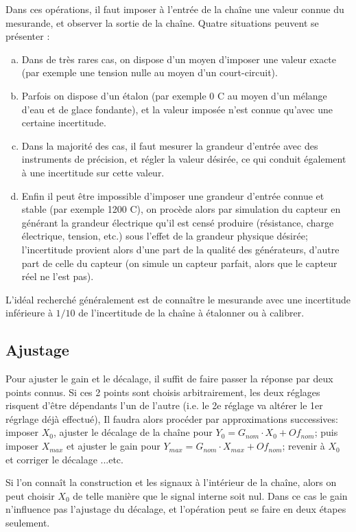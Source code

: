 \documentclass[main.tex]{subfiles}
\begin{document}
Dans ces opérations, il faut imposer à l'entrée de la chaîne une valeur connue du mesurande, et observer la sortie de la chaîne. Quatre situations peuvent se présenter :
\begin{enumerate}[a)]
    \item Dans de très rares cas, on dispose d'un moyen d'imposer une valeur exacte (par exemple une tension nulle au moyen d'un court-circuit).
    \item Parfois on dispose d'un étalon (par exemple 0 \degree C au moyen d'un mélange d'eau et de glace fondante), et la valeur imposée n'est connue qu'avec une certaine incertitude.
    \item Dans la majorité des cas, il faut mesurer la grandeur d'entrée avec des instruments de précision, et  régler la valeur désirée, ce qui conduit également à une incertitude sur cette valeur.
    \item Enfin il peut être impossible d'imposer une grandeur d'entrée connue et stable (par exemple 1200 \degree C), on procède alors par simulation du capteur en générant la grandeur électrique qu'il est censé produire (résistance, charge électrique, tension, etc.) sous l'effet de la grandeur physique désirée; l'incertitude provient alors d'une part de la qualité des générateurs, d'autre part de celle du capteur (on simule un capteur parfait, alors que le capteur réel ne l'est pas).
\end{enumerate}
L'idéal recherché généralement est de connaître le mesurande avec une incertitude inférieure à $1/10$ de l'incertitude de la chaîne à étalonner ou à calibrer.

\subsection{Ajustage}

Pour ajuster le gain et le décalage, il suffit de faire passer la réponse par deux points connus. Si ces 2 points sont choisis arbitrairement, les deux réglages risquent d'être dépendants l'un de l'autre (i.e. le 2e réglage va altérer le 1er régrlage déjà effectué), Il faudra alors procéder par approximations successives: imposer $X_{0}$, ajuster le décalage de la chaîne pour $Y_{0} = G_{nom} \cdot X_{0} + Of_{nom}$; puis imposer $X_{max}$ et ajuster le gain pour $Y_{max} = G_{nom} \cdot X_{max} + Of_{nom}$; revenir à $X_{0}$ et corriger le décalage ...etc.

Si l'on connaît la construction et les signaux à l'intérieur de la chaîne, alors on peut choisir $X_{0}$ de telle manière que le signal interne soit nul. Dans ce cas le gain n'influence pas l'ajustage du décalage, et l'opération peut se faire en deux étapes seulement.
\end{document}
